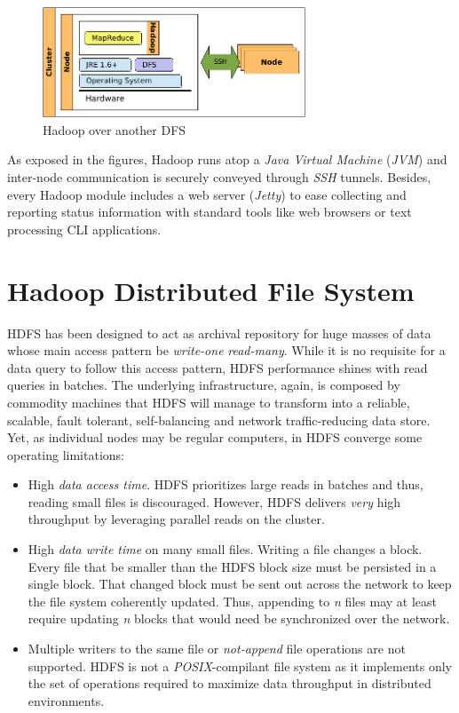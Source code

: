 \begin{figure}[tbp]
\begin{center}
\includegraphics[width=0.7\textwidth]{imagenes/016.pdf}
 \caption{Hadoop over another DFS}
\label{fig:hadoopmapreddfs}
\end{center}
\end{figure}

As exposed in the figures, Hadoop runs atop a \emph{Java Virtual Machine} (\emph{JVM}) and inter-node communication is securely conveyed through \emph{SSH} tunnels. Besides, every Hadoop module includes a web server (\emph{Jetty}) to ease collecting and reporting status information with standard tools like web browsers or text processing CLI applications.

\section{Hadoop Distributed File System}\label{sec:hdfs}
\noindent HDFS has been designed to act as archival repository for huge masses of data whose main access pattern be \emph{write-one} \emph{read-many}. While it is no requisite for a data query to follow this access pattern, HDFS performance shines with read queries in batches. The underlying infrastructure, again, is composed by commodity machines that HDFS will manage to transform into a reliable, scalable, fault tolerant, self-balancing and network traffic-reducing data store. Yet, as individual nodes may be regular computers, in HDFS converge some operating limitations:

\begin{itemize}
 \item High \emph{data access time}. HDFS prioritizes large reads in batches and thus, reading small files is  discouraged. However, HDFS delivers \emph{very} high throughput by leveraging parallel reads on the cluster.
 \item High \emph{data write time} on many small files. Writing a file changes a block. Every file that be smaller than the HDFS block size must be persisted in a single block. That changed block must be sent out across the network to keep the file system coherently updated. Thus, appending to \emph{n} files may at least require updating \emph{n} blocks that would need be synchronized over the network.
 \item Multiple writers to the same file or \emph{not-append} file operations are not supported. HDFS is not a \emph{POSIX}-compilant file system as it implements only the set of operations required to maximize data throughput in distributed environments.
\end{itemize}


